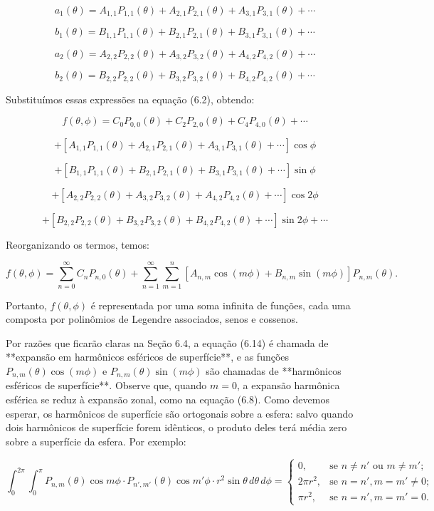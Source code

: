 $$
a_1(\theta) = A_{1,1} P_{1,1}(\theta) + A_{2,1} P_{2,1}(\theta) + A_{3,1} P_{3,1}(\theta) + \cdots
$$

$$
b_1(\theta) = B_{1,1} P_{1,1}(\theta) + B_{2,1} P_{2,1}(\theta) + B_{3,1} P_{3,1}(\theta) + \cdots
$$

$$
a_2(\theta) = A_{2,2} P_{2,2}(\theta) + A_{3,2} P_{3,2}(\theta) + A_{4,2} P_{4,2}(\theta) + \cdots
$$

$$
b_2(\theta) = B_{2,2} P_{2,2}(\theta) + B_{3,2} P_{3,2}(\theta) + B_{4,2} P_{4,2}(\theta) + \cdots
$$

Substituímos essas expressões na equação (6.2), obtendo:

$$
f(\theta, \phi) = C_0 P_{0,0}(\theta) + C_2 P_{2,0}(\theta) + C_4 P_{4,0}(\theta) + \cdots
$$

$$
+ \left[ A_{1,1} P_{1,1}(\theta) + A_{2,1} P_{2,1}(\theta) + A_{3,1} P_{3,1}(\theta) + \cdots \right] \cos\phi
$$

$$
+ \left[ B_{1,1} P_{1,1}(\theta) + B_{2,1} P_{2,1}(\theta) + B_{3,1} P_{3,1}(\theta) + \cdots \right] \sin\phi
$$

$$
+ \left[ A_{2,2} P_{2,2}(\theta) + A_{3,2} P_{3,2}(\theta) + A_{4,2} P_{4,2}(\theta) + \cdots \right] \cos 2\phi
$$

$$
+ \left[ B_{2,2} P_{2,2}(\theta) + B_{3,2} P_{3,2}(\theta) + B_{4,2} P_{4,2}(\theta) + \cdots \right] \sin 2\phi + \cdots
$$

Reorganizando os termos, temos:

$$
f(\theta, \phi) = \sum_{n=0}^{\infty} C_n P_{n,0}(\theta)
+ \sum_{n=1}^{\infty} \sum_{m=1}^{n} \left[ A_{n,m} \cos(m\phi) + B_{n,m} \sin(m\phi) \right] P_{n,m}(\theta). \tag{6.14}
$$

Portanto, $f(\theta, \phi)$ é representada por uma soma infinita de funções, cada uma composta por polinômios de Legendre associados, senos e cossenos.

Por razões que ficarão claras na Seção 6.4, a equação (6.14) é chamada de **expansão em harmônicos esféricos de superfície**, e as funções $P_{n,m}(\theta) \cos(m\phi)$ e $P_{n,m}(\theta) \sin(m\phi)$ são chamadas de **harmônicos esféricos de superfície**. Observe que, quando $m = 0$, a expansão harmônica esférica se reduz à expansão zonal, como na equação (6.8). Como devemos esperar, os harmônicos de superfície são ortogonais sobre a esfera: salvo quando dois harmônicos de superfície forem idênticos, o produto deles terá média zero sobre a superfície da esfera. Por exemplo:

$$
\int_0^{2\pi} \int_0^{\pi} P_{n,m}(\theta) \cos m\phi \cdot P_{n',m'}(\theta) \cos m'\phi \cdot r^2 \sin\theta \, d\theta \, d\phi =
\begin{cases}
0, & \text{se } n \ne n' \text{ ou } m \ne m'; \\
2\pi r^2, & \text{se } n = n', m = m' \ne 0; \\
\pi r^2, & \text{se } n = n', m = m' = 0.
\end{cases} \tag{6.15}
$$

